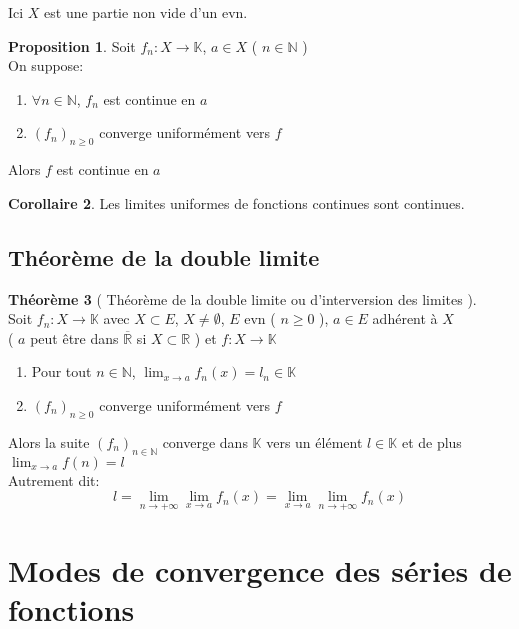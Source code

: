 \documentclass[10pt,a4paper]{article}
\theoremstyle{definition}
\newtheorem{proposition}{Proposition}[section]
\newtheorem{theorem}[proposition]{Théorème}
\newtheorem{corollaire}[proposition]{Corollaire}
\begin{document}
\noindent Ici $X$ est une partie non vide d'un evn.

\begin{proposition}
    Soit $f_n: X \to \mathbb{K}$, $a \in X$ ( $n \in \mathbb{N}$ ) \\
    On suppose:
    \begin{enumerate}
        \item $\forall n \in \mathbb{N}$, $f_n$ est continue en $a$
        \item $(f_n)_{n \geq 0}$ converge uniformément vers $f$
    \end{enumerate}
    Alors $f$ est continue en $a$
\end{proposition}
\begin{corollaire}
    Les limites uniformes de fonctions continues sont continues.
\end{corollaire}

\subsection{Théorème de la double limite}
\begin{theorem}[ Théorème de la double limite ou d'interversion des limites ]
    \hfill \\
    Soit $f_n: X \to \mathbb{K}$ avec $X \subset E$, $X \neq \emptyset$, $E$ evn ( $n \geq 0$ ), $a \in E$ adhérent à $X$ \\ 
    ( $a$ peut être dans $\overline{\mathbb{R}}$ si $X \subset \mathbb{R}$ ) et $f: X \to \mathbb{K}$
    \begin{enumerate}
        \item Pour tout $n \in \mathbb{N}$, $\lim_{x \to a} f_n(x) = l_n \in \mathbb{K}$
        \item $(f_n)_{n \geq 0}$ converge uniformément vers $f$
    \end{enumerate}
    Alors la suite $(f_n)_{n \in \mathbb{N}}$ converge dans $\mathbb{K}$ vers un élément $l \in \mathbb{K}$ et de plus $\lim_{x \to a}f(n) = l$ \\
    Autrement dit:
    \[ l = \lim_{n \to +\infty} \lim_{x \to a} f_n(x) = \lim_{x \to a} \lim_{n \to +\infty} f_n(x)\]
\end{theorem}

\section{Modes de convergence des séries de fonctions}
\end{document}
